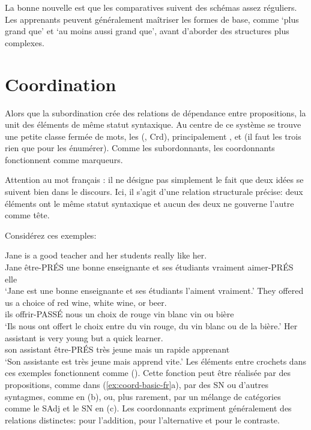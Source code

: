 La bonne nouvelle est que les comparatives suivent des schémas assez réguliers. Les apprenants peuvent généralement maîtriser les formes de base, comme  `plus grand que' et  `au moins aussi grand que', avant d'aborder des structures plus complexes.

\section{Coordination}\label{sec:coordination-fr}

Alors que la subordination crée des relations de dépendance entre propositions, la  unit des éléments de même statut syntaxique. Au centre de ce système se trouve une petite classe fermée de mots, les  (, Crd), principalement ,  et  (il faut les trois rien que pour les énumérer). Comme les subordonnants, les coordonnants fonctionnent comme marqueurs.

Attention au mot français : il ne désigne pas simplement le fait que deux idées se suivent bien dans le discours. Ici, il s'agit d'une relation structurale précise: deux éléments ont le même statut syntaxique et aucun des deux ne gouverne l'autre comme tête.

Considérez ces exemples:

\ea \label{ex:coord-basic-fr}
    \ea \gll {\ob}Jane is a good teacher{\cb} {\ob}and her students really like her{\cb}.\\
        Jane être-PRÉS une bonne enseignante et ses étudiants vraiment aimer-PRÉS elle\\
    \glt `Jane est une bonne enseignante et ses étudiants l'aiment vraiment.'
    \ex \gll They offered us a choice of {\ob}red wine{\cb}, {\ob}white wine{\cb}, {\ob}or beer{\cb}.\\
        ils offrir-PASSÉ nous un choix de rouge vin blanc vin ou bière\\
    \glt `Ils nous ont offert le choix entre du vin rouge, du vin blanc ou de la bière.'
    \ex \gll Her assistant is {\ob}very young{\cb} {\ob}but a quick learner{\cb}.\\
        son assistant être-PRÉS très jeune mais un rapide apprenant\\
    \glt `Son assistante est très jeune mais apprend vite.'
    \z
\z
Les éléments entre crochets dans ces exemples fonctionnent comme  (). Cette fonction peut être réalisée par des propositions, comme dans (\ref{ex:coord-basic-fr}a), par des SN ou d'autres syntagmes, comme en (b), ou, plus rarement, par un mélange de catégories comme le SAdj et le SN en (c). Les coordonnants expriment généralement des relations distinctes:  pour l'addition,  pour l'alternative et  pour le contraste.

